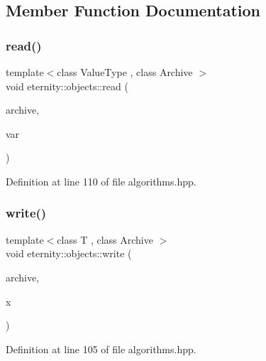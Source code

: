 \subsection{Member Function Documentation}
\mbox{\label{structeternity_1_1objects_a7454fa173d59bfe23b5ac6fa78cbdfc9}} 
\subsubsection{\texorpdfstring{read()}{read()}}
{\footnotesize\ttfamily template$<$class Value\+Type , class Archive $>$ \\
void eternity\+::objects\+::read (\begin{DoxyParamCaption}\item[{Archive \&}]{archive,  }\item[{Value\+Type $\ast$}]{var }\end{DoxyParamCaption})}



Definition at line 110 of file algorithms.\+hpp.

\mbox{\label{structeternity_1_1objects_a4a22aa281cdd22163b1a4f52065185e6}} 
\subsubsection{\texorpdfstring{write()}{write()}}
{\footnotesize\ttfamily template$<$class T , class Archive $>$ \\
void eternity\+::objects\+::write (\begin{DoxyParamCaption}\item[{Archive \&}]{archive,  }\item[{T \&}]{x }\end{DoxyParamCaption})}



Definition at line 105 of file algorithms.\+hpp.

\mbox{\label{structeternity_1_1objects_a784de99cba7a1d4a1a048fa6a4ac5a4f}} 
